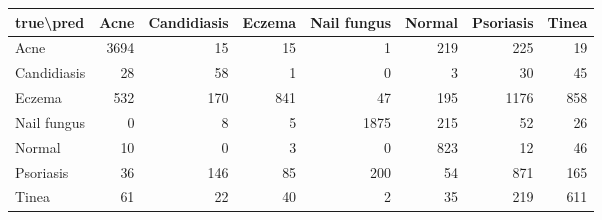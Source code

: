 \begin{tabular}{lrrrrrrr}
\toprule
true\textbackslash pred & Acne & Candidiasis & Eczema & Nail fungus & Normal & Psoriasis & Tinea \\
\midrule
Acne & 3694 & 15 & 15 & 1 & 219 & 225 & 19 \\
Candidiasis & 28 & 58 & 1 & 0 & 3 & 30 & 45 \\
Eczema & 532 & 170 & 841 & 47 & 195 & 1176 & 858 \\
Nail fungus & 0 & 8 & 5 & 1875 & 215 & 52 & 26 \\
Normal & 10 & 0 & 3 & 0 & 823 & 12 & 46 \\
Psoriasis & 36 & 146 & 85 & 200 & 54 & 871 & 165 \\
Tinea & 61 & 22 & 40 & 2 & 35 & 219 & 611 \\
\bottomrule
\end{tabular}
